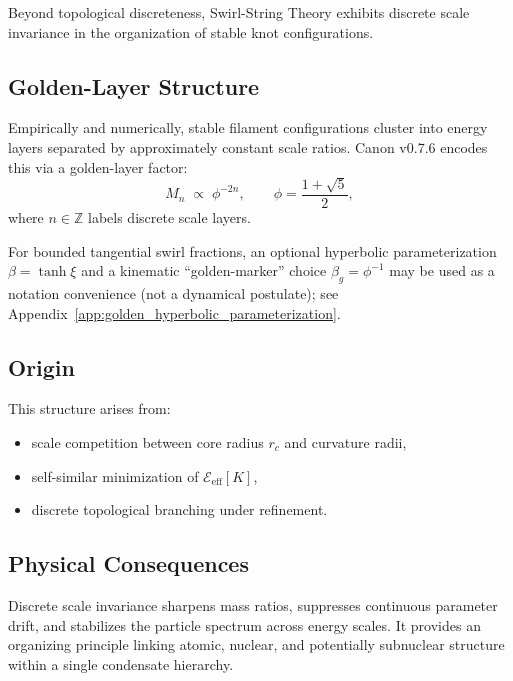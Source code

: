 \documentclass[10pt]{article}
\begin{document}
Beyond topological discreteness, Swirl-String Theory exhibits discrete
scale invariance in the organization of stable knot configurations.

\subsection{Golden-Layer Structure}

Empirically and numerically, stable filament configurations cluster into
energy layers separated by approximately constant scale ratios.
Canon v0.7.6 encodes this via a golden-layer factor:
\begin{equation}
    M_n \;\propto\; \phi^{-2n}, \qquad \phi=\frac{1+\sqrt{5}}{2},
\end{equation}
where $n\in\mathbb{Z}$ labels discrete scale layers.

For bounded tangential swirl fractions, an optional hyperbolic parameterization
$\beta=\tanh\xi$ and a kinematic ``golden-marker'' choice $\beta_g=\phi^{-1}$
may be used as a notation convenience (not a dynamical postulate); see
Appendix~\ref{app:golden_hyperbolic_parameterization}.

\subsection{Origin}

This structure arises from:
\begin{itemize}
    \item scale competition between core radius $r_c$ and curvature radii,
    \item self-similar minimization of $\mathcal{E}_{\mathrm{eff}}[K]$,
    \item discrete topological branching under refinement.
\end{itemize}

\subsection{Physical Consequences}

Discrete scale invariance sharpens mass ratios, suppresses continuous
parameter drift, and stabilizes the particle spectrum across energy scales.
It provides an organizing principle linking atomic, nuclear, and potentially
subnuclear structure within a single condensate hierarchy.

\end{document}
